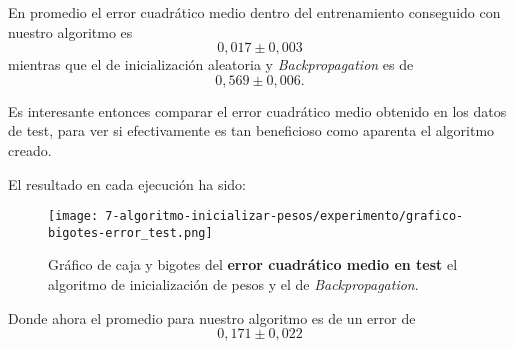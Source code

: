 En promedio el error cuadrático medio dentro del entrenamiento conseguido con nuestro algoritmo es 
\begin{equation}
    0,017 \pm 0,003
\end{equation}
mientras que el de inicialización aleatoria y \textit{Backpropagation} es de 
\begin{equation}
    0,569 \pm 0,006. 
\end{equation}

Es interesante entonces comparar el error cuadrático medio obtenido en los datos de test, para ver si efectivamente es tan beneficioso como aparenta el algoritmo creado. 

El resultado en cada ejecución ha sido: 

\begin{table}[H]
    \centering
    \caption{Error mínimo cuadrático \textbf{en test} tras finalizar las sucesivas repeticiones del algoritmo}
\end{table}


\begin{figure}[H]
    \centering
     \texttt{[image: 7-algoritmo-inicializar-pesos/experimento/grafico-bigotes-error\_test.png]}
     \caption{Gráfico de caja y bigotes del \textbf{error cuadrático medio en test } el algoritmo de inicialización de pesos y el de \textit{Backpropagation}.}
     \label{img07:error-test}
\end{figure}

Donde ahora el promedio para nuestro algoritmo es de un error de
\begin{equation}
    0,171 \pm 0,022
\end{equation}


